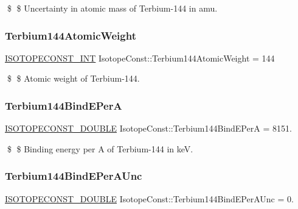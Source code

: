 \$ \$ Uncertainty in atomic mass of Terbium-\/144 in amu. \mbox{\label{group___isotope_const-_terbium-_tb144_ga58a6018170435ff9b2c1963434d299ce}} 
\subsubsection{\texorpdfstring{Terbium144\+Atomic\+Weight}{Terbium144AtomicWeight}}
{\footnotesize\ttfamily \mbox{\hyperlink{group___isotope_const-_macros_ga5f18360b3e99483a35c32d789e62621c}{I\+S\+O\+T\+O\+P\+E\+C\+O\+N\+S\+T\+\_\+\+I\+NT}} Isotope\+Const\+::\+Terbium144\+Atomic\+Weight = 144}

\$ \$ Atomic weight of Terbium-\/144. \mbox{\label{group___isotope_const-_terbium-_tb144_gac8726eed8c88b16cac4795674589cb8a}} 
\subsubsection{\texorpdfstring{Terbium144\+Bind\+E\+PerA}{Terbium144BindEPerA}}
{\footnotesize\ttfamily \mbox{\hyperlink{group___isotope_const-_macros_ga8f45a7272ce02c0b4c65c44636ed719a}{I\+S\+O\+T\+O\+P\+E\+C\+O\+N\+S\+T\+\_\+\+D\+O\+U\+B\+LE}} Isotope\+Const\+::\+Terbium144\+Bind\+E\+PerA = 8151.}

\$ \$ Binding energy per A of Terbium-\/144 in keV. \mbox{\label{group___isotope_const-_terbium-_tb144_ga50803ba721ef541e388730c63a6a4fbc}} 
\subsubsection{\texorpdfstring{Terbium144\+Bind\+E\+Per\+A\+Unc}{Terbium144BindEPerAUnc}}
{\footnotesize\ttfamily \mbox{\hyperlink{group___isotope_const-_macros_ga8f45a7272ce02c0b4c65c44636ed719a}{I\+S\+O\+T\+O\+P\+E\+C\+O\+N\+S\+T\+\_\+\+D\+O\+U\+B\+LE}} Isotope\+Const\+::\+Terbium144\+Bind\+E\+Per\+A\+Unc = 0.}

